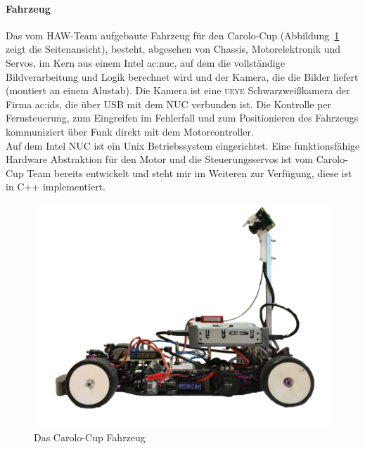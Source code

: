 \paragraph{Fahrzeug}
Das vom HAW-Team aufgebaute Fahrzeug für den Carolo-Cup (Abbildung~\ref{img:Carolo-Fahrzeug} zeigt die Seitenansicht), besteht, abgesehen von Chassis, Motorelektronik und Servos, im Kern aus einem Intel \gls{ac:nuc}, auf dem die vollständige Bildverarbeitung und Logik berechnet wird und der Kamera, die die Bilder liefert (montiert an einem Alustab). Die Kamera ist eine \textsc{ueye} Schwarzweißkamera der Firma \gls{ac:ids}, die über USB mit dem NUC verbunden ist. 
Die Kontrolle per Fernsteuerung, zum Eingreifen im Fehlerfall und zum Positionieren des Fahrzeugs kommuniziert über Funk direkt mit dem Motorcontroller.\\
Auf dem Intel NUC ist ein Unix Betriebssystem eingerichtet.
Eine funktionsfähige Hardware Abstraktion für den Motor und die Steuerungsservos ist vom Carolo-Cup Team bereits entwickelt und steht mir im Weiteren zur Verfügung, diese ist in C++ implementiert.\\

\begin{figure}[h]
	\centering
	\includegraphics[scale=0.3]{figures/Fahrzeug.png}
	\caption{Das Carolo-Cup Fahrzeug}
	\label{img:Carolo-Fahrzeug}
\end{figure}
